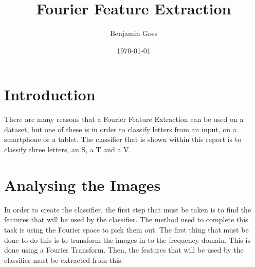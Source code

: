 \documentclass[a4paper]{article}
\title{Fourier Feature Extraction}
\author{Benjamin Goss}
\date{\today}
\begin{document}

\maketitle


\section{Introduction}
There are many reasons that a Fourier Feature Extraction can be used on a dataset, but one of these is in order to classify letters from an input, on a smartphone or a tablet. The classifier that is shown within this report is to classify three letters, an S, a T and a V. 
\section{Analysing the Images}
In order to create the classifier, the first step that must be taken is to find the features that will be used by the classifier. The method used to complete this task is using the Fourier space to pick them out. The first thing that must be done to do this is to transform the images in to the frequency domain. This is done using a Fourier Transform. Then, the features that will be used by the classifier must be extracted from this.
\end{document}
